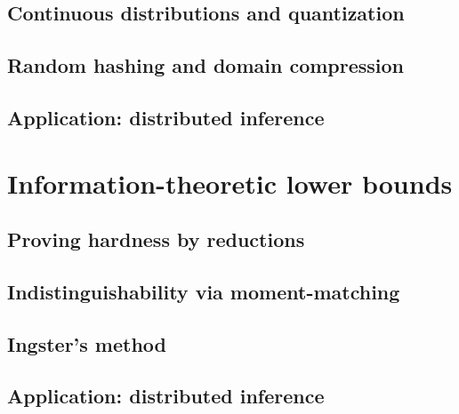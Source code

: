 \documentclass[biber]{nowfnt} %
\begin{document}
\section{Continuous distributions and quantization}
\section{Random hashing and domain compression}
  \label{sec:domain:compression}
\section{Application: distributed inference}

\chapter{Information-theoretic lower bounds}
  \label{chap:lowerbounds}
\section{Proving hardness by reductions}
\section{Indistinguishability via moment-matching}
\section{Ingster's method}
\section{Application: distributed inference}
\end{document}
